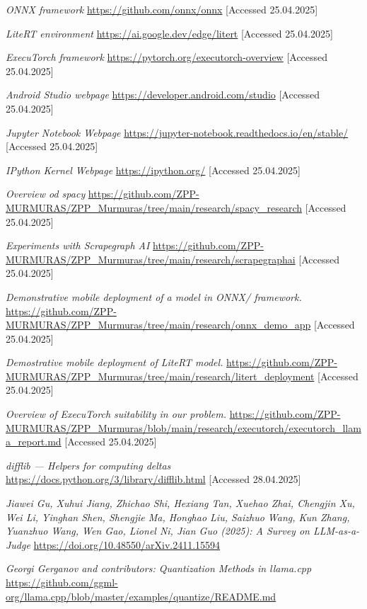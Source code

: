 \documentclass[licencjacka,en]{pracamgr}
\begin{document}
\begin{thebibliography}{199}
\textit{ONNX framework}
\url{https://github.com/onnx/onnx}
[Accessed 25.04.2025]

\textit{LiteRT environment}
\url{https://ai.google.dev/edge/litert}
[Accessed 25.04.2025]

\textit{ExecuTorch framework}
\url{https://pytorch.org/executorch-overview}
[Accessed 25.04.2025]

\textit{Android Studio webpage}
\url{https://developer.android.com/studio}
[Accessed 25.04.2025]

\textit{Jupyter Notebook Webpage}
\url{https://jupyter-notebook.readthedocs.io/en/stable/}
[Accessed 25.04.2025]

\textit{IPython Kernel Webpage}
\url{https://ipython.org/}
[Accessed 25.04.2025]

\textit{Overview od spacy}
\url{https://github.com/ZPP-MURMURAS/ZPP_Murmuras/tree/main/research/spacy_research}
[Accessed 25.04.2025]

\textit{Experiments with Scrapegraph AI}
\url{https://github.com/ZPP-MURMURAS/ZPP_Murmuras/tree/main/research/scrapegraphai}
[Accessed 25.04.2025]

\textit{Demonstrative mobile deployment of a model in ONNX/ framework.}
\url{https://github.com/ZPP-MURMURAS/ZPP_Murmuras/tree/main/research/onnx_demo_app}
[Accessed 25.04.2025]

\textit{Demostrative mobile deployment of LiteRT model.}
\url{https://github.com/ZPP-MURMURAS/ZPP_Murmuras/tree/main/research/litert_deployment}
[Accessed 25.04.2025]

\textit{Overview of ExecuTorch suitability in our problem.}
\url{https://github.com/ZPP-MURMURAS/ZPP_Murmuras/blob/main/research/executorch/executorch_llama_report.md}
[Accessed 25.04.2025]

\textit{difflib --- Helpers for computing deltas}
\url{https://docs.python.org/3/library/difflib.html}
[Accessed 28.04.2025]

\textit{Jiawei Gu, Xuhui Jiang, Zhichao Shi, Hexiang Tan, Xuehao Zhai, Chengjin Xu, Wei Li, Yinghan Shen, Shengjie Ma, Honghao Liu, Saizhuo Wang, Kun Zhang, Yuanzhuo Wang, Wen Gao, Lionel Ni, Jian Guo (2025): A Survey on LLM-as-a-Judge}
\url{https://doi.org/10.48550/arXiv.2411.15594}

\textit{Georgi Gerganov and contributors: Quantization Methods in llama.cpp}
\url{https://github.com/ggml-org/llama.cpp/blob/master/examples/quantize/README.md}



\end{thebibliography}
\end{document}
